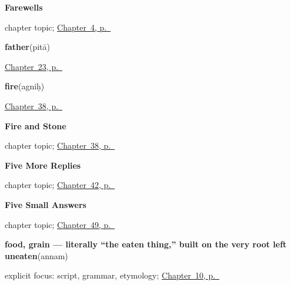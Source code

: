 \noindent\begin{minipage}[t]{\linewidth}
\raggedright
\textbf{Farewells}\par
\footnotesize chapter topic; \hyperref[ch:farewells]{Chapter~4, p.~\pageref*{ch:farewells}}
\end{minipage}\par\smallskip

\noindent\begin{minipage}[t]{\linewidth}
\raggedright
\textbf{father}\enspace\emph{}\enspace(pitā)\par
\footnotesize \hyperref[ch:sa-kinship]{Chapter~23, p.~\pageref*{ch:sa-kinship}}
\end{minipage}\par\smallskip

\noindent\begin{minipage}[t]{\linewidth}
\raggedright
\textbf{fire}\enspace\emph{}\enspace(agniḥ)\par
\footnotesize \hyperref[ch:sa-fire-and-stone]{Chapter~38, p.~\pageref*{ch:sa-fire-and-stone}}
\end{minipage}\par\smallskip

\noindent\begin{minipage}[t]{\linewidth}
\raggedright
\textbf{Fire and Stone}\par
\footnotesize chapter topic; \hyperref[ch:sa-fire-and-stone]{Chapter~38, p.~\pageref*{ch:sa-fire-and-stone}}
\end{minipage}\par\smallskip

\noindent\begin{minipage}[t]{\linewidth}
\raggedright
\textbf{Five More Replies}\par
\footnotesize chapter topic; \hyperref[ch:sa-replies-third]{Chapter~42, p.~\pageref*{ch:sa-replies-third}}
\end{minipage}\par\smallskip

\noindent\begin{minipage}[t]{\linewidth}
\raggedright
\textbf{Five Small Answers}\par
\footnotesize chapter topic; \hyperref[ch:sa-small-answers]{Chapter~49, p.~\pageref*{ch:sa-small-answers}}
\end{minipage}\par\smallskip

\noindent\begin{minipage}[t]{\linewidth}
\raggedright
\textbf{food, grain — literally \textquotedblleft{}the eaten thing,\textquotedblright{} built on the very root  left uneaten}\enspace\emph{}\enspace(annam)\par
\footnotesize explicit focus: script, grammar, etymology; \hyperref[ch:sa-request-nouns]{Chapter~10, p.~\pageref*{ch:sa-request-nouns}}
\end{minipage}\par\smallskip

